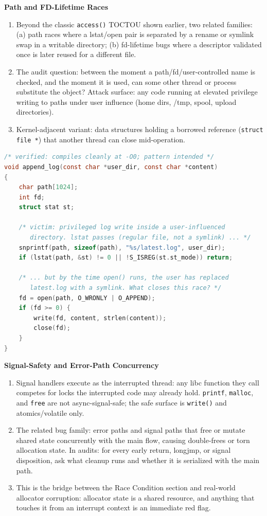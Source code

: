 \documentclass[12pt]{Training}
\begin{document}
\textbf{Path and FD-Lifetime Races}
\begin{enumerate}
    \item Beyond the classic \lstinline{access()} TOCTOU shown earlier, two related families: (a) path races where a lstat/open pair is separated by a rename or symlink swap in a writable directory; (b) fd-lifetime bugs where a descriptor validated once is later reused for a different file.
    \item The audit question: between the moment a path/fd/user-controlled name is checked, and the moment it is used, can some other thread or process substitute the object? Attack surface: any code running at elevated privilege writing to paths under user influence (home dirs, /tmp, spool, upload directories).
    \item Kernel-adjacent variant: data structures holding a borrowed reference (\lstinline{struct file *}) that another thread can close mid-operation.
\end{enumerate}

\begin{sectionbox}
\begin{lstlisting}[language=C, caption={Path Race}]
/* verified: compiles cleanly at -O0; pattern intended */
void append_log(const char *user_dir, const char *content)
{
    char path[1024];
    int fd;
    struct stat st;

    /* victim: privileged log write inside a user-influenced
       directory. lstat passes (regular file, not a symlink) ... */
    snprintf(path, sizeof(path), "%s/latest.log", user_dir);
    if (lstat(path, &st) != 0 || !S_ISREG(st.st_mode)) return;

    /* ... but by the time open() runs, the user has replaced
       latest.log with a symlink. What closes this race? */
    fd = open(path, O_WRONLY | O_APPEND);
    if (fd >= 0) {
        write(fd, content, strlen(content));
        close(fd);
    }
}
\end{lstlisting}
\end{sectionbox}

\textbf{Signal-Safety and Error-Path Concurrency}
\begin{enumerate}
    \item Signal handlers execute as the interrupted thread: any libc function they call competes for locks the interrupted code may already hold. \lstinline{printf}, \lstinline{malloc}, and \lstinline{free} are not async-signal-safe; the safe surface is \lstinline{write()} and atomics/volatile only.
    \item The related bug family: error paths and signal paths that free or mutate shared state concurrently with the main flow, causing double-frees or torn allocation state. In audits: for every early return, longjmp, or signal disposition, ask what cleanup runs and whether it is serialized with the main path.
    \item This is the bridge between the Race Condition section and real-world allocator corruption: allocator state is a shared resource, and anything that touches it from an interrupt context is an immediate red flag.
\end{enumerate}
\end{document}
